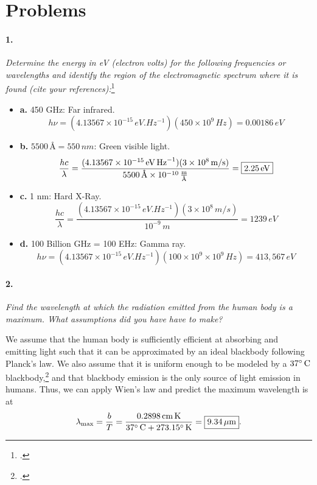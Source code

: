 \documentclass[12pt]{article}
\begin{document}
\newpage
\section{Problems}

\paragraph{1.} \emph{Determine the energy in eV (electron volts) for the following frequencies or wavelengths and identify the region of the electromagnetic spectrum where it is found (cite your references):}\footcite{em} \medskip

\begin{itemize}
    \item[] \textbf{a.} 450 GHz: Far infrared. \[h \nu = (4.13567\times10^{-15}\,\si{eV.Hz^{-1}})(450\times10^9\,\si{Hz}) = \boxed{0.00186\,\si{eV}}\]
    \item[] \textbf{b.} $5500\,\si{\angstrom} = 550\,\si{nm}$: Green visible light.
    \[\frac{h c}{\lambda} = \frac{(4.13567\times10^{-15}\,\si{eV.Hz^{-1}}) (3\times10^8\,\si{m/s})}{5500\,\si{\angstrom}\times 10^{-10}\,\si{\frac{m}{\angstrom}}} = \boxed{2.25\,\si{eV}}\]
    \item[] \textbf{c.} 1 nm: Hard X-Ray.\[\frac{hc}{\lambda} = \frac{(4.13567\times10^{-15}\,\si{eV.Hz^{-1}}) (3\times10^8\,\si{m/s})}{10^{-9}\,\si{m}} = \boxed{1239\,\si{eV}}\]
    \item[] \textbf{d.} 100 Billion GHz = 100 EHz: Gamma ray.\[h\nu = (4.13567\times10^{-15}\,\si{eV.Hz^{-1}}) (100\times10^9\times10^9\,\si{Hz})=\boxed{413,567\,\si{eV}}\]
    
\end{itemize}

\paragraph{2.} \emph{Find the wavelength at which the radiation emitted from the human body is a maximum. What assumptions did you have have to make?} \medskip

We assume that the human body is sufficiently efficient at absorbing and emitting light such that it can be approximated by an ideal blackbody following Planck's law. We also assume that it is uniform enough to be modeled by a $37\degree\,\si{C}$ blackbody,\footcite{wolframalpha} and that blackbody emission is the only source of light emission in humans. Thus, we can apply Wien's law and predict the maximum wavelength is at
\begin{equation}
    \lambda_\text{max} = \frac{b}{T} = \frac{0.2898\,\si{cm.K}}{37\degree\,\si{C}+273.15\degree\,\si{K}} = \boxed{9.34\,\si{\mu m}}.
\end{equation}
\end{document}
